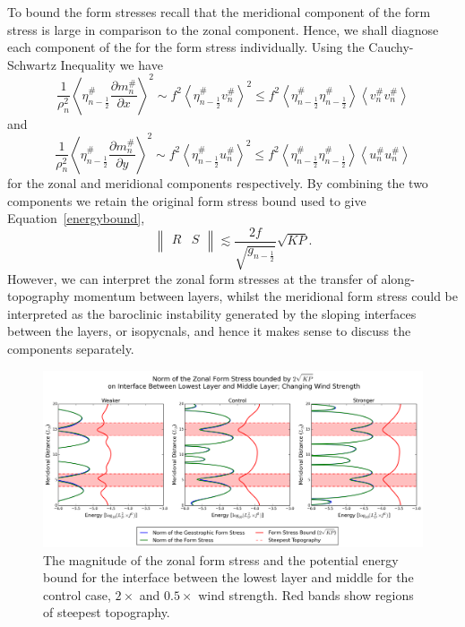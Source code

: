\documentclass[12pt,a4paper]{report}
\newcommand*\nthkmean[1]{\left\langle{#1}\right\rangle}
\newcommand*\nthkres[1]{{#1}^{\#}}
\newcommand*\equref[1]{Equation~\eqref{#1}}
\newcommand*{\half}{\frac{1}{2}}
\newcommand*{\partialdiff}[2][{}]{\frac{\partial #1}{\partial #2}}
\begin{document}
To bound the form stresses recall that the meridional component of the
form stress is large in comparison to the zonal component.
 Hence, we shall diagnose each component of the
for the form stress individually. Using the Cauchy-Schwartz Inequality we have
\begin{equation}
\frac{1}{\rho_{n}^{2}}\nthkmean{\nthkres{\eta}_{n-\half}\partialdiff[\nthkres{m}_n]{x}}^{2}
\sim{f^{2}}\nthkmean{\nthkres{\eta}_{n-\half}\nthkres{v}_n}^{2}
\leq{f^{2}}\nthkmean{\nthkres{\eta}_{n-\half}\nthkres{\eta}_{n-\half}}\nthkmean{\nthkres{v}_n\nthkres{v}_n}
\label{zonalbound}
\end{equation}
and 
\begin{equation}
\frac{1}{\rho_{n}^{2}}\nthkmean{\nthkres{\eta}_{n-\half}\partialdiff[\nthkres{m}_n]{y}}^{2}
\sim{f^{2}}\nthkmean{\nthkres{\eta}_{n-\half}\nthkres{u}_n}^{2}
\leq{f^{2}}\nthkmean{\nthkres{\eta}_{n-\half}\nthkres{\eta}_{n-\half}}\nthkmean{\nthkres{u}_n\nthkres{u}_n}
\label{meridionalbound}
\end{equation}
for the zonal and meridional components respectively. 
By combining the two components we retain the original form stress bound used to give
\equref{energybound},
\begin{equation}\left\|
\begin{array}{cc}
R & S\\
\end{array}
\right\| \lesssim \frac{2 f}{\sqrt{g_{n-\half}}} \sqrt{KP}.
\end{equation}
However, we can interpret the zonal form stresses at the transfer of along-topography
momentum between layers, whilst the meridional form stress could be interpreted as the
baroclinic instability generated by the sloping interfaces between the layers, or isopycnals, and hence it makes sense to discuss the components separately. 



\begin{figure}
	\centering
	\includegraphics[width=\linewidth]{uepebound_0_0}
	\caption{ The magnitude of the zonal form stress and the potential energy bound for the
		 interface between
		the lowest layer and middle for the control case, $2\times$ and $0.5\times$ wind strength.  Red bands show regions of steepest topography.}
	\label{uepebound00}
\end{figure}
\end{document}
